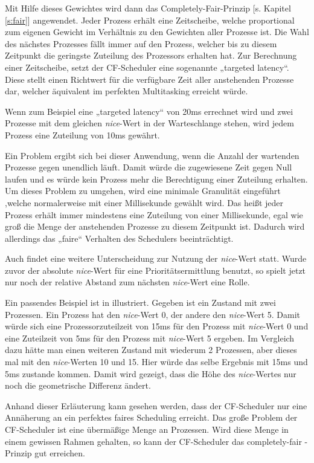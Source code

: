 Mit Hilfe dieses Gewichtes wird dann das  Completely-Fair-Prinzip [s. Kapitel \ref{s:fair}] angewendet. Jeder Prozess erhält eine Zeitscheibe, welche proportional zum eigenen Gewicht im Verhältnis zu den Gewichten aller Prozesse ist. Die Wahl des nächstes Prozesses fällt immer auf den Prozess, welcher bis zu diesem Zeitpunkt die geringste Zuteilung des Prozessors erhalten hat.
Zur Berechnung einer Zeitscheibe, setzt der CF-Scheduler eine sogenannte „targeted latency“. Diese stellt einen Richtwert für die verfügbare Zeit aller anstehenden Prozesse dar, welcher äquivalent im perfekten Multitasking erreicht würde.

Wenn zum Beispiel eine „targeted latency“ von 20ms errechnet wird und zwei Prozesse mit dem gleichen  \textit{nice}-Wert in der Warteschlange stehen, wird jedem Prozess eine Zuteilung von 10ms gewährt.

Ein Problem ergibt sich bei dieser Anwendung, wenn die Anzahl der wartenden Prozesse gegen unendlich läuft. Damit würde die zugewiesene Zeit gegen Null laufen und es würde kein Prozess mehr die Berechtigung einer Zuteilung erhalten. Um dieses Problem zu umgehen, wird eine minimale Granulität eingeführt ,welche normalerweise mit einer Millisekunde gewählt wird. Das heißt jeder Prozess erhält immer mindestens eine Zuteilung von einer Millisekunde, egal wie groß die Menge der anstehenden Prozesse zu diesem Zeitpunkt ist. Dadurch wird allerdings das „faire“ Verhalten des Schedulers beeinträchtigt. 

Auch findet eine weitere Unterscheidung zur Nutzung der  \textit{nice}-Wert statt. Wurde zuvor der absolute  \textit{nice}-Wert für eine Prioritätsermittlung benutzt, so spielt jetzt nur noch der relative Abstand zum nächsten  \textit{nice}-Wert eine Rolle.

Ein passendes Beispiel ist in \cite{rlove} illustriert. Gegeben ist ein Zustand mit zwei Prozessen. Ein Prozess hat den  \textit{nice}-Wert 0, der andere den  \textit{nice}-Wert 5. Damit würde sich eine Prozessorzuteilzeit von 15ms für den Prozess mit  \textit{nice}-Wert 0 und eine Zuteilzeit von 5ms für den Prozess mit  \textit{nice}-Wert 5 ergeben.
Im Vergleich dazu hätte man einen weiteren Zustand mit wiederum 2 Prozessen, aber dieses mal mit den  \textit{nice}-Werten 10 und 15. Hier würde das selbe Ergebnis mit 15ms und 5ms zustande kommen. Damit wird gezeigt, dass die Höhe des  \textit{nice}-Wertes nur noch die geometrische Differenz ändert.

Anhand dieser Erläuterung kann gesehen werden, dass der CF-Scheduler nur eine Annäherung an ein perfektes faires Scheduling erreicht. Das große Problem der CF-Scheduler ist eine übermäßige Menge an Prozessen. Wird diese Menge in einem gewissen Rahmen gehalten, so kann der CF-Scheduler das  completely-fair -Prinzip gut erreichen. 
